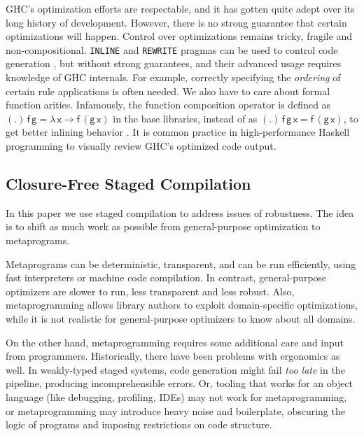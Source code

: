 \documentclass[acmsmall,screen]{acmart}
\newcommand{\lam}{\lambda\,}
\newcommand{\vx}{\mathsf{x}}
\newcommand{\vf}{\mathsf{f}}
\newcommand{\vg}{\mathsf{g}}
\theoremstyle{remark}
\begin{document}
GHC's optimization efforts are respectable, and it has gotten quite adept over
its long history of development. However, there is no strong guarantee that
certain optimizations will happen. Control over optimizations remains tricky,
fragile and non-compositional. \texttt{INLINE} and \texttt{REWRITE} pragmas can
be used to control code generation \cite{ghcdocs}, but without strong
guarantees, and their advanced usage requires knowledge of GHC internals. For
example, correctly specifying the \emph{ordering} of certain rule applications
is often needed. We also have to care about formal function arities. Infamously,
the function composition operator is defined as $(.)\,\vf\,\vg = \lam \vx \to
\vf\,(\vg\,\vx)$ in the base libraries, instead of as $(.)\,\vf\,\vg\,\vx =
\vf\,(\vg\,\vx)$, to get better inlining behavior \cite{ghcbase}. It is common
practice in high-performance Haskell programming to visually review GHC's
optimized code output.

\subsection{Closure-Free Staged Compilation}

In this paper we use staged compilation to address issues of robustness. The
idea is to shift as much work as possible from general-purpose optimization to
metaprograms.

Metaprograms can be deterministic, transparent, and can be run efficiently,
using fast interpreters or machine code compilation. In contrast,
general-purpose optimizers are slower to run, less transparent and less
robust. Also, metaprogramming allows library authors to exploit
domain-specific optimizations, while it is not realistic for general-purpose
optimizers to know about all domains.

On the other hand, metaprogramming requires some additional care and input from
programmers. Historically, there have been problems with ergonomics as well. In
weakly-typed staged systems, code generation might fail \emph{too late} in the
pipeline, producing incomprehensible errors. Or, tooling that works for an
object language (like debugging, profiling, IDEs) may not work for metaprogramming, or
metaprogramming may introduce heavy noise and boilerplate, obscuring the logic
of programs and imposing restrictions on code structure.
\end{document}
